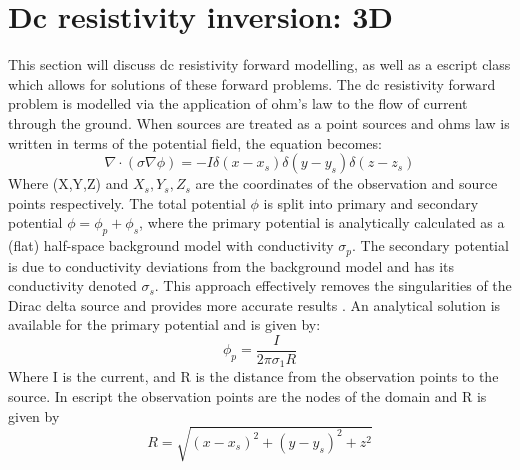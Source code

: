 %
%
%

\section{Dc resistivity inversion: 3D}\label{sec:forward DCRES}
This section will discuss dc resistivity forward modelling, as well as a escript
class which allows for solutions of these forward problems. The dc resistivity 
forward problem is modelled via the application of ohm's law to the flow of current
through the ground. When sources are treated as a point sources and ohms law 
is written in terms of the potential field, the equation becomes:
\begin{equation} \label{ref:dcres:eq1}
\nabla \cdot (\sigma \nabla \phi) = -I \delta(x-x_s) \delta(y-y_s) \delta(z-z_s)
\end{equation}
Where (X,Y,Z) and $X_s, Y_s, Z_s$ are the coordinates of the observation and source
points respectively. The total potential $\phi$ is split into primary and secondary 
potential $\phi = \phi_p + \phi_s$, where the primary potential is analytically calculated 
as a (flat) half-space background model with conductivity $\sigma_p$. 
The secondary potential is due to conductivity deviations 
from the background model and has its conductivity denoted $\sigma_s$. 
This approach effectively removes the singularities of the Dirac delta 
source and provides more accurate results \cite{rucker2006three}.
An analytical solution is available for the primary potential and is given by:
\begin{equation} \label{ref:dcres:eq2}
\phi_p = \frac{I}{2 \pi \sigma_1 R}
\end{equation}
Where I is the current, and R is the distance from the observation points to the source.
In escript the observation points are the nodes of the domain and R is given by
\begin{equation} \label{ref:dcres:eq3}
R = \sqrt{(x-x_s)^2+(y-y_s)^2 + z^2}
\end{equation}
